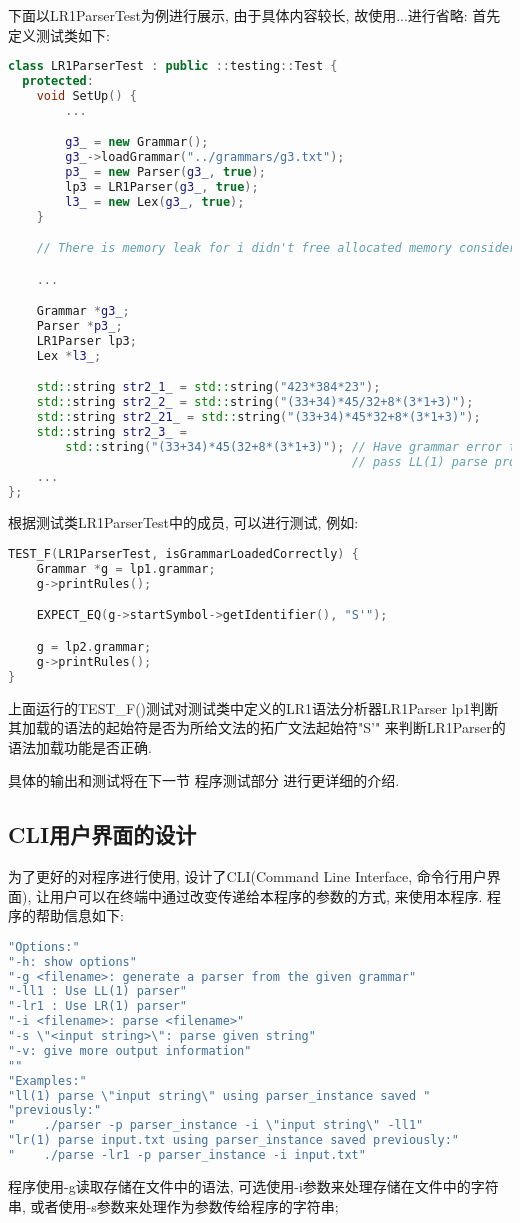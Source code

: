 下面以LR1ParserTest为例进行展示, 由于具体内容较长, 故使用...进行省略:
首先定义测试类如下:
\begin{lstlisting}[language=c++]
class LR1ParserTest : public ::testing::Test {
  protected:
    void SetUp() {
        ...

        g3_ = new Grammar();
        g3_->loadGrammar("../grammars/g3.txt");
        p3_ = new Parser(g3_, true);
        lp3 = LR1Parser(g3_, true);
        l3_ = new Lex(g3_, true);
    }

    // There is memory leak for i didn't free allocated memory considering tight time.

    ...

    Grammar *g3_;
    Parser *p3_;
    LR1Parser lp3;
    Lex *l3_;

    std::string str2_1_ = std::string("423*384*23");
    std::string str2_2_ = std::string("(33+34)*45/32+8*(3*1+3)");
    std::string str2_21_ = std::string("(33+34)*45*32+8*(3*1+3)");
    std::string str2_3_ =
        std::string("(33+34)*45(32+8*(3*1+3)"); // Have grammar error that can't
                                                // pass LL(1) parse process.
    ...
};
\end{lstlisting}

根据测试类LR1ParserTest中的成员, 可以进行测试, 例如:
\begin{lstlisting}[language=c++]
TEST_F(LR1ParserTest, isGrammarLoadedCorrectly) {
    Grammar *g = lp1.grammar;
    g->printRules();

    EXPECT_EQ(g->startSymbol->getIdentifier(), "S'");

    g = lp2.grammar;
    g->printRules();
}
\end{lstlisting}

上面运行的TEST\_F()测试对测试类中定义的LR1语法分析器LR1Parser
lp1判断其加载的语法的起始符是否为所给文法的拓广文法起始符"S'"
来判断LR1Parser的语法加载功能是否正确.

具体的输出和测试将在下一节 程序测试部分 进行更详细的介绍.

\subsection{CLI用户界面的设计}

为了更好的对程序进行使用, 设计了CLI(Command Line Interface, 命令行用户界面),
让用户可以在终端中通过改变传递给本程序的参数的方式, 来使用本程序.
程序的帮助信息如下:

\begin{lstlisting}[language=c++]
"Options:"
"-h: show options"
"-g <filename>: generate a parser from the given grammar"
"-ll1 : Use LL(1) parser"
"-lr1 : Use LR(1) parser"
"-i <filename>: parse <filename>"
"-s \"<input string>\": parse given string"
"-v: give more output information"
""
"Examples:"
"ll(1) parse \"input string\" using parser_instance saved "
"previously:"
"    ./parser -p parser_instance -i \"input string\" -ll1"
"lr(1) parse input.txt using parser_instance saved previously:"
"    ./parse -lr1 -p parser_instance -i input.txt"
\end{lstlisting}

程序使用-g读取存储在文件中的语法, 可选使用-i参数来处理存储在文件中的字符串,
或者使用-s参数来处理作为参数传给程序的字符串;
